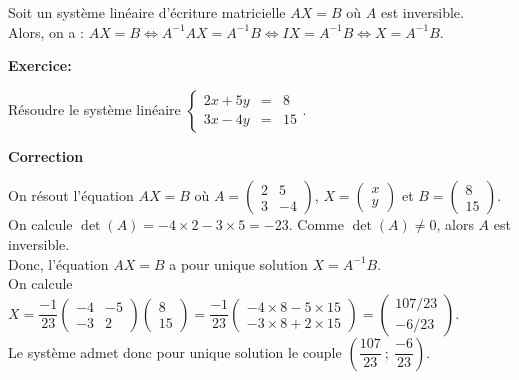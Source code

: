 \documentclass{cornouaille}
\begin{document}
\begin{preuve}
Soit un système linéaire d'écriture matricielle $AX=B$ où $A$ est inversible.\\
Alors, on a  :
$AX=B \Leftrightarrow A^{-1}AX = A^{-1}B \Leftrightarrow
IX=A^{-1}B \Leftrightarrow X=A^{-1}B$.
\end{preuve}


\begin{methode}
 

\textbf{Exercice:}

 \label{TMS1_M_resolution_systeme0}
Résoudre le système linéaire  $\left\{\begin{array}{lcc}
2x+5y & = & 8 \\
3x-4y & = & 15
\end{array}\right. $.


\textbf{Correction}


On résout l'équation $AX=B$ où
$A=\begin{pmatrix}
   2 & 5 \\
   3 & -4
 \end{pmatrix}$, $X=\begin{pmatrix}
   x \\
   y
 \end{pmatrix}$ et   $B=\begin{pmatrix}
   8 \\
   15
\end{pmatrix}$.\\
On calcule $\det(A)=-4\times2-3\times5=-23$. Comme $\det(A)\neq0$, alors $A$ est inversible.\\
Donc, l'équation $AX=B$ a pour unique solution $X=A^{-1}B$.\\
On calcule $X=\dfrac{-1}{23}\begin{pmatrix} -4 & -5 \\
   -3 & 2
 \end{pmatrix}\begin{pmatrix}
   8 \\
   15
\end{pmatrix}=\dfrac{-1}{23}\begin{pmatrix} -4\times8-5\times15 \\ -3\times8+2\times15\end{pmatrix}=\begin{pmatrix}107/23 \\ -6/23 \end{pmatrix}$.\\
Le système admet donc pour unique solution le couple $\left(\dfrac{107}{23}~;~\dfrac{-6}{23}\right)$.
\end{methode}
\end{document}
